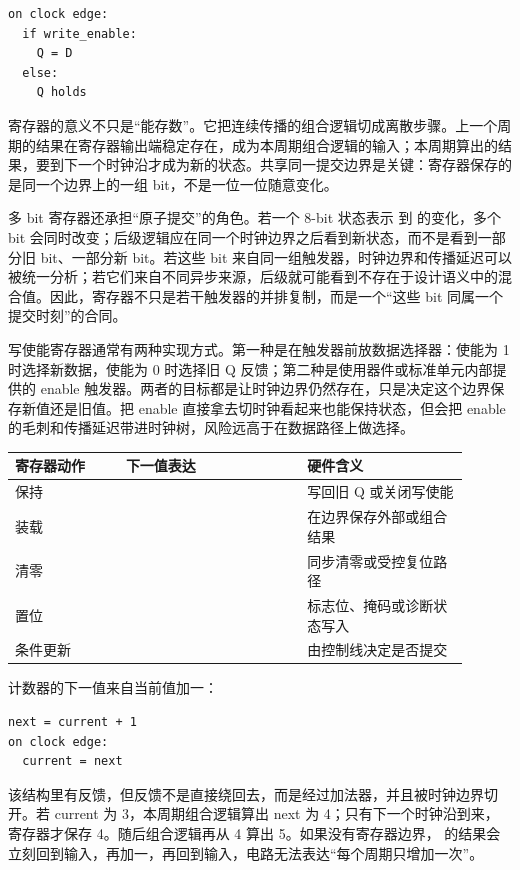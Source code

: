 \begin{lstlisting}
on clock edge:
  if write_enable:
    Q = D
  else:
    Q holds
\end{lstlisting}



寄存器的意义不只是“能存数”。它把连续传播的组合逻辑切成离散步骤。上一个周期的结果在寄存器输出端稳定存在，成为本周期组合逻辑的输入；本周期算出的结果，要到下一个时钟沿才成为新的状态。共享同一提交边界是关键：寄存器保存的是同一个边界上的一组 bit，不是一位一位随意变化。

多 bit 寄存器还承担“原子提交”的角色。若一个 8-bit 状态表示  到  的变化，多个 bit 会同时改变；后级逻辑应在同一个时钟边界之后看到新状态，而不是看到一部分旧 bit、一部分新 bit。若这些 bit 来自同一组触发器，时钟边界和传播延迟可以被统一分析；若它们来自不同异步来源，后级就可能看到不存在于设计语义中的混合值。因此，寄存器不只是若干触发器的并排复制，而是一个“这些 bit 同属一个提交时刻”的合同。

写使能寄存器通常有两种实现方式。第一种是在触发器前放数据选择器：使能为 1 时选择新数据，使能为 0 时选择旧 Q 反馈；第二种是使用器件或标准单元内部提供的 enable 触发器。两者的目标都是让时钟边界仍然存在，只是决定这个边界保存新值还是旧值。把 enable 直接拿去切时钟看起来也能保持状态，但会把 enable 的毛刺和传播延迟带进时钟树，风险远高于在数据路径上做选择。

\begin{longtable}{L{0.22\linewidth}L{0.36\linewidth}L{0.32\linewidth}}
\toprule
寄存器动作 & 下一值表达 & 硬件含义 \\
\midrule
保持 &  & 写回旧 Q 或关闭写使能 \\
装载 &  & 在边界保存外部或组合结果 \\
清零 &  & 同步清零或受控复位路径 \\
置位 &  & 标志位、掩码或诊断状态写入 \\
条件更新 &  & 由控制线决定是否提交 \\
\bottomrule
\end{longtable}

计数器的下一值来自当前值加一：

\begin{lstlisting}
next = current + 1
on clock edge:
  current = next
\end{lstlisting}



该结构里有反馈，但反馈不是直接绕回去，而是经过加法器，并且被时钟边界切开。若 current 为 3，本周期组合逻辑算出 next 为 4；只有下一个时钟沿到来，寄存器才保存 4。随后组合逻辑再从 4 算出 5。如果没有寄存器边界， 的结果会立刻回到输入，再加一，再回到输入，电路无法表达“每个周期只增加一次”。

